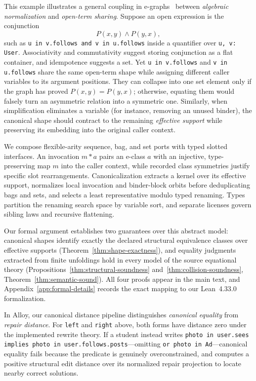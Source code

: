 This example illustrates a general coupling in e-graphs~\cite{ogEgraphs1,egraphsOG,egg,eqsat,eqsat-lmcs}
between \emph{algebraic normalization} and \emph{open-term sharing}. Suppose an
open expression is the conjunction
\[
 P(x,y)\land P(y,x),
\]
such as \texttt{u in v.follows and v in u.follows} inside a quantifier over
\texttt{u, v: User}. Associativity and commutativity suggest storing
conjunction as a flat container, and idempotence suggests a set. Yet
\texttt{u in v.follows} and \texttt{v in u.follows} share the same open-term
shape while assigning different caller variables to its argument positions. They
can collapse into one set element only if the graph has proved $P(x,y)=P(y,x)$;
otherwise, equating them would falsely turn an asymmetric relation into a
symmetric one. Similarly, when simplification eliminates a variable (for
instance, removing an unused binder), the canonical shape should contract to the
remaining \emph{effective support} while preserving its embedding into the
original caller context.

We compose flexible-arity sequence, bag, and set ports with typed slotted
interfaces. An invocation $m*a$ pairs an e-class $a$ with an injective,
type-preserving map $m$ into the caller context, while recorded class symmetries
justify specific slot rearrangements. Canonicalization extracts a kernel over
its effective support, normalizes local invocation and binder-block orbits
before deduplicating bags and sets, and selects a least representative modulo
typed renaming. Types partition the renaming search space by variable sort, and
separate licenses govern sibling laws and recursive flattening.

Our formal argument establishes two guarantees over this abstract model:
canonical shapes identify exactly the declared structural equivalence classes
over effective supports (Theorem~\ref{thm:shape-exactness}), and equality
judgments extracted from finite unfoldings hold in every model of the source
equational theory (Propositions~\ref{thm:structural-soundness}
and~\ref{thm:collision-soundness}, Theorem~\ref{thm:semantic-sound}). All four
proofs appear in the main text, and Appendix~\ref{app:formal-details} records the
exact mapping to our Lean~4.33.0 formalization.

In Alloy, our canonical distance pipeline \CanDis{} distinguishes
\emph{canonical equality} from \emph{repair distance}. For \texttt{left} and
\texttt{right} above, both forms have distance zero under the implemented
rewrite theory. If a student instead writes \texttt{photo in user.sees implies
photo in user.follows.posts}—omitting \texttt{or photo in Ad}—canonical
equality fails because the predicate is genuinely overconstrained, and
\CanDis{} computes a positive structural edit distance over its normalized
repair projection to locate nearby correct solutions.

